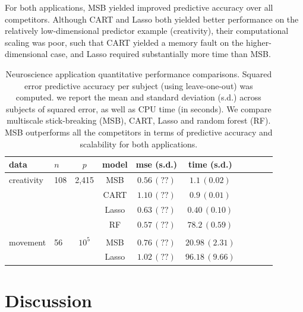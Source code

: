 \documentclass{article} %
\begin{document}
For both applications, MSB yielded improved predictive accuracy over all competitors.  Although CART and Lasso both yielded better performance on the relatively low-dimensional predictor example (creativity), their computational scaling was poor, such that CART yielded a memory fault on the higher-dimensional case, and Lasso required substantially more time than MSB.  







\begin{table}[t]
\caption{Neuroscience application quantitative performance comparisons. Squared error predictive accuracy per subject (using leave-one-out) was computed. we report the mean and standard deviation (s.d.) across subjects of squared error, as well as CPU time (in seconds).
We compare multiscale stick-breaking (MSB), CART, Lasso and random forest (RF). MSB outperforms all the competitors in terms of predictive accuracy and scalability for both applications.}\label{real}
\vskip 0.15in
\begin{center}
\begin{small}
\begin{sc}
\begin{tabular}{llcccccccc}
\hline
data &$n$&$p$ &model&mse (s.d.) & time (s.d.) \\ %
\hline
creativity & 108 & 2,415 & MSB &$0.56 \, (??)$ &  $1.1 \, (0.02)$\\
 &&& CART & $1.10 \, (??) $ &  $0.9 \, (0.01)$\\
&&& Lasso & $0.63 \, (??)$  &  $0.40 \, (0.10)$\\
&&& RF & $0.57 \, (??)$ &   $78.2 \, (0.59)$\\
\\
 movement & 56 & $10^5$& MSB &$0.76 \, (??)$  & $20.98 \, (2.31)$\\
 &&& Lasso & $1.02 \, (??)$ & $96.18 \, (9.66)$\\
\hline
\end{tabular}
\end{sc}
\end{small}
\end{center}
\vspace{-10pt}
\end{table}

\section{Discussion} \label{sec:disc}
\end{document}
